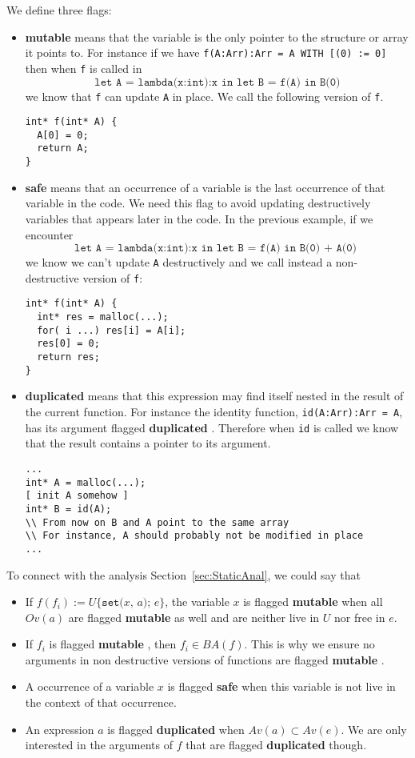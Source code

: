 \documentclass[12pt,a4paper]{article}
\newcommand{\cl}[1]{\texttt{#1}}
\newcommand{\bang}{ \textbf{ mutable } }
\newcommand{\safe}{ \textbf{ safe } }
\newcommand{\dupl}{ \textbf{ duplicated } }
\newcommand{\ucont}[1]{\{#1\}}
\begin{document}
We define three flags:
\begin{itemize}
\item \bang means that the variable is the only pointer to the structure or array it points to. For instance if we have \cl{f(A:Arr):Arr = A WITH [(0) := 0]} then when \cl{f} is called in
$$ \cl{let A = lambda(x:int):x in let B = f(A) in B(0)} $$
we know that \cl{f} can update \cl{A} in place. We call the following version of \cl{f}.
\begin{lstlisting}
int* f(int* A) {
  A[0] = 0;
  return A;
}
\end{lstlisting}

\item \safe means that an occurrence of a variable is the last occurrence of that variable in the code. We need this flag to avoid updating destructively variables that appears later in the code. In the previous example, if we encounter
$$ \cl{let A = lambda(x:int):x in let B = f(A) in B(0) + A(0) }$$
we know we can't update \cl{A} destructively and we call instead a non-destructive version of \cl{f}:
\begin{lstlisting}
int* f(int* A) {
  int* res = malloc(...);
  for( i ...) res[i] = A[i];
  res[0] = 0;
  return res;
}
\end{lstlisting}

\item \dupl means that this expression may find itself nested in the result of the current function. For instance the identity function, \cl{id(A:Arr):Arr = A}, has its argument flagged \dupl. Therefore when \cl{id} is called we know that the result contains a pointer to its argument.
\begin{lstlisting}
...
int* A = malloc(...);
[ init A somehow ]
int* B = id(A);
\\ From now on B and A point to the same array
\\ For instance, A should probably not be modified in place
...
\end{lstlisting}
\end{itemize}

To connect with the analysis Section~\ref{sec:StaticAnal}, we could say that
\begin{itemize}
\item If $f(f_i) := U\ucont{\cl{set(}x\cl{, }a\cl{); }e}$, the variable $x$ is flagged \bang when all $Ov(a)$ are flagged \bang as well and are neither live in $U$ nor free in $e$.
\item If $f_i$ is flagged \bang, then $f_i \in BA(f)$. This is why we ensure no arguments in non destructive versions of functions are flagged \bang.
\item A occurrence of a variable $x$ is flagged \safe when this variable is not live in the context of that occurrence.
\item An expression $a$ is flagged \dupl when $Av(a) \subset Av(e)$. We are only interested in the arguments of $f$ that are flagged \dupl though.
\end{itemize}
\end{document}
